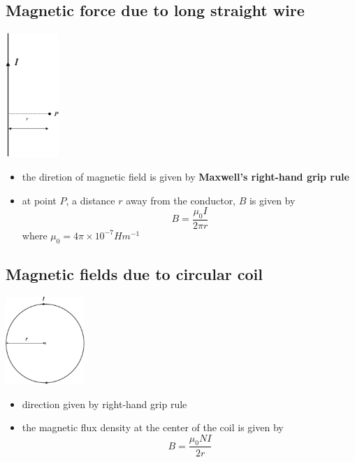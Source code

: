 \documentclass[a4paper, 10pt]{article}
\begin{document}
\subsection{Magnetic force due to long straight wire}
\begin{minipage}{0.5\textwidth}
   \begin{center}
    \includegraphics[width=2cm]{figures/3.pdf} 
   \end{center}	
\end{minipage}	
\begin{minipage}{0.5\textwidth}
\begin{itemize}
   \item the diretion of magnetic field is given by \textbf{Maxwell's right-hand grip rule}
   \item at point $P$, a distance $r$  away from the conductor, $B$ is given by
      \[
      B = \frac{\mu_0 I}{2 \pi r}
      \]
      where $\mu_0 = 4 \pi \times 10^{-7} Hm^{-1}$ 
      
\end{itemize}	
\end{minipage}	

\subsection{Magnetic fields due to circular coil}
\begin{minipage}{0.5\textwidth}
   \begin{center}
     \includegraphics[width=3cm]{figures/4.pdf} 
   \end{center}	
\end{minipage}	
\begin{minipage}{0.5\textwidth}
   \begin{itemize}
      \item direction given by right-hand grip rule
      \item the magnetic flux density at the center of the coil is given by
         \[
         B = \frac{\mu_0 N I}{2r}
         \]
   \end{itemize}	
\end{minipage}	
\end{document}
